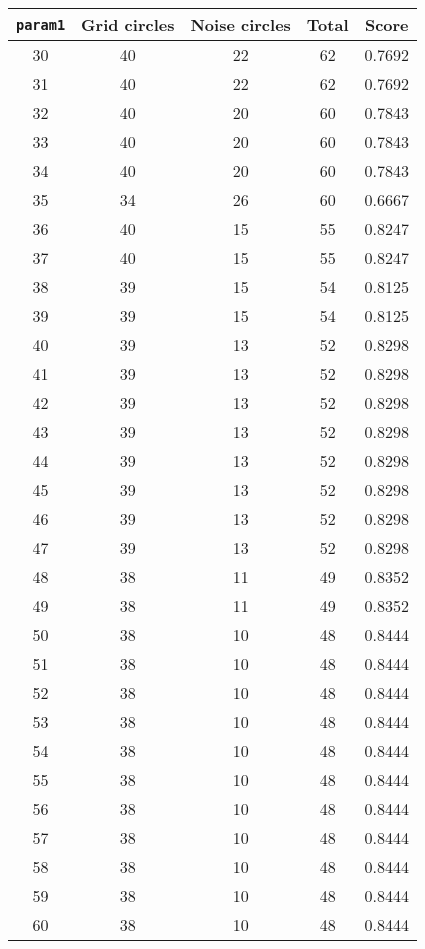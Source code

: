 \documentclass[letterpaper, 12pt]{article}
\begin{document}
\begin{longtable}{|c|c|c|c|c|}
\hline
\textbf{\texttt{param1}} & \textbf{Grid circles} & \textbf{Noise circles} & \textbf{Total} & \textbf{Score} \\
\hline
30 & 40 & 22 & 62 & 0.7692 \\
\hline
31 & 40 & 22 & 62 & 0.7692 \\
\hline
32 & 40 & 20 & 60 & 0.7843 \\
\hline
33 & 40 & 20 & 60 & 0.7843 \\
\hline
34 & 40 & 20 & 60 & 0.7843 \\
\hline
35 & 34 & 26 & 60 & 0.6667 \\
\hline
36 & 40 & 15 & 55 & 0.8247 \\
\hline
37 & 40 & 15 & 55 & 0.8247 \\
\hline
38 & 39 & 15 & 54 & 0.8125 \\
\hline
39 & 39 & 15 & 54 & 0.8125 \\
\hline
40 & 39 & 13 & 52 & 0.8298 \\
\hline
41 & 39 & 13 & 52 & 0.8298 \\
\hline
42 & 39 & 13 & 52 & 0.8298 \\
\hline
43 & 39 & 13 & 52 & 0.8298 \\
\hline
44 & 39 & 13 & 52 & 0.8298 \\
\hline
45 & 39 & 13 & 52 & 0.8298 \\
\hline
46 & 39 & 13 & 52 & 0.8298 \\
\hline
47 & 39 & 13 & 52 & 0.8298 \\
\hline
48 & 38 & 11 & 49 & 0.8352 \\
\hline
49 & 38 & 11 & 49 & 0.8352 \\
\hline
50 & 38 & 10 & 48 & 0.8444 \\
\hline
51 & 38 & 10 & 48 & 0.8444 \\
\hline
52 & 38 & 10 & 48 & 0.8444 \\
\hline
53 & 38 & 10 & 48 & 0.8444 \\
\hline
54 & 38 & 10 & 48 & 0.8444 \\
\hline
55 & 38 & 10 & 48 & 0.8444 \\
\hline
56 & 38 & 10 & 48 & 0.8444 \\
\hline
57 & 38 & 10 & 48 & 0.8444 \\
\hline
58 & 38 & 10 & 48 & 0.8444 \\
\hline
59 & 38 & 10 & 48 & 0.8444 \\
\hline
60 & 38 & 10 & 48 & 0.8444 \\

\end{longtable}
\end{document}
